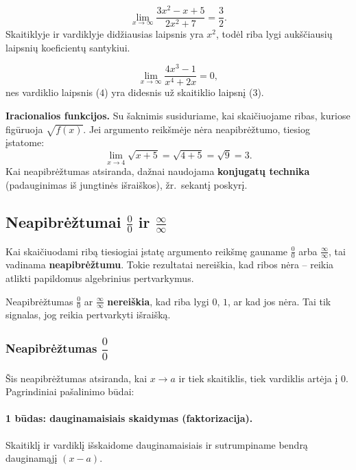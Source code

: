 \begin{example}
\[
  \lim_{x \to \infty} \frac{3x^2 - x + 5}{2x^2 + 7} = \frac{3}{2}.
\]
Skaitiklyje ir vardiklyje didžiausias laipsnis yra $x^2$, todėl riba lygi aukščiausių
laipsnių koeficientų santykiui.
\end{example}

\begin{example}
\[
  \lim_{x \to \infty} \frac{4x^3 - 1}{x^4 + 2x} = 0,
\]
nes vardiklio laipsnis ($4$) yra didesnis už skaitiklio laipsnį ($3$).
\end{example}

\textbf{Iracionalios funkcijos.} Su šaknimis susiduriame, kai skaičiuojame ribas,
kuriose figūruoja $\sqrt{f(x)}$. Jei argumento reikšmėje nėra neapibrėžtumo, tiesiog
įstatome:
\[
  \lim_{x \to 4} \sqrt{x + 5} = \sqrt{4 + 5} = \sqrt{9} = 3.
\]
Kai neapibrėžtumas atsiranda, dažnai naudojama \textbf{konjugatų technika} (padauginimas
iš jungtinės išraiškos), žr.\ sekantį poskyrį.

\subsection{Neapibrėžtumai \texorpdfstring{$\frac{0}{0}$}{0/0}
            ir \texorpdfstring{$\frac{\infty}{\infty}$}{infty/infty}}

Kai skaičiuodami ribą tiesiogiai įstatę argumento reikšmę gauname $\frac{0}{0}$ arba
$\frac{\infty}{\infty}$, tai vadinama \textbf{neapibrėžtumu}. Tokie rezultatai nereiškia,
kad ribos nėra -- reikia atlikti papildomus algebrinius pertvarkymus.

\begin{tcolorbox}[colback=yellow!10, colframe=orange!80!black, title=Svarbiausia taisyklė]
Neapibrėžtumas $\frac{0}{0}$ ar $\frac{\infty}{\infty}$ \textbf{nereiškia}, kad riba lygi
$0$, $1$, ar kad jos nėra. Tai tik signalas, jog reikia pertvarkyti išraišką.
\end{tcolorbox}

\subsubsection*{Neapibrėžtumas $\dfrac{0}{0}$}

Šis neapibrėžtumas atsiranda, kai $x \to a$ ir tiek skaitiklis, tiek vardiklis artėja į $0$.
Pagrindiniai pašalinimo būdai:

\paragraph{1 būdas: dauginamaisiais skaidymas (faktorizacija).}
Skaitiklį ir vardiklį išskaidome dauginamaisiais ir sutrumpiname bendrą dauginamąjį
$(x - a)$.

